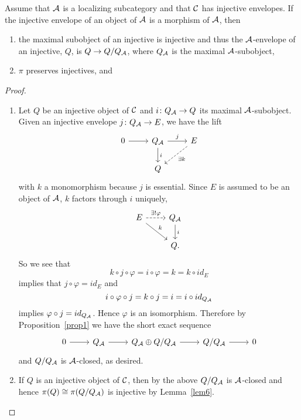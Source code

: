 \documentclass[dissertation.tex]{subfiles}
\begin{document}
\begin{cor}\label{cor2}
  Assume that $\mathcal{A}$ is a localizing subcategory and that $\mathcal{C}$ has injective envelopes.
  If the injective envelope of an object of $\mathcal{A}$ is a morphism of $\mathcal{A}$, then
  \begin{enumerate}
  \item\label{cor2.1}
    the maximal subobject of an injective is injective and thus the $\mathcal{A}$-envelope of an injective, $Q$, is $Q \rightarrow Q/Q_{\mathcal{A}}$, where $Q_{\mathcal{A}}$ is the maximal $\mathcal{A}$-subobject, 
  \item\label{cor2.2}
    $\pi$ preserves injectives, and
  \end{enumerate}
  \begin{proof}
    \begin{enumerate}
    \item
      Let $Q$ be an injective object of $\mathcal{C}$ and $i \colon Q_{\mathcal{A}} \rightarrow Q$ its maximal $\mathcal{A}$-subobject.
      Given an injective envelope $j \colon Q_{\mathcal{A}} \rightarrow E$, we have the lift
      $$\begin{tikzcd}
        0 \arrow{r} & Q_\A \arrow{d}{i} \arrow{r}{j} & E \arrow[dashed]{ld}{\exists k}\\
        & Q
      \end{tikzcd}$$
      with $k$ a monomorphism because $j$ is essential.
      Since $E$ is assumed to be an object of $\mathcal{A}$, $k$ factors through $i$ uniquely,
      $$\begin{tikzcd}
        E \arrow{rd}{k}\arrow[dashed]{r}{\exists !\varphi} & Q_\A\arrow{d}{i}\\
        & Q.
      \end{tikzcd}$$
      So we see that
      $$k \circ j \circ \varphi = i \circ \varphi = k = k \circ id_E$$
      implies that  $j \circ \varphi = id_E$
      and
      $$i \circ \varphi \circ j = k \circ j = i = i \circ id_{Q_{\mathcal{A}}}$$
      implies $\varphi \circ j = id_{Q_{\mathcal{A}}}$.
      Hence $\varphi$ is an isomorphism.
      Therefore by Proposition~\ref{prop1} we have the short exact sequence
      $$\begin{tikzcd}
        0 \arrow{r} & Q_\A \arrow{r} & Q_\A \oplus Q/Q_\A \arrow{r} & Q/Q_\A \arrow{r} & 0
      \end{tikzcd}$$
      and $Q/Q_{\mathcal{A}}$ is $\mathcal{A}$-closed, as desired.
    \item
      If $Q$ is an injective object of $\mathcal{C}$, then by the above $Q/Q_{\mathcal{A}}$ is $\mathcal{A}$-closed and hence $\pi(Q) \cong \pi(Q/Q_{\mathcal{A}})$ is injective by Lemma~\ref{lem6}.
      

\end{enumerate}
\end{proof}
\end{cor}
\end{document}
